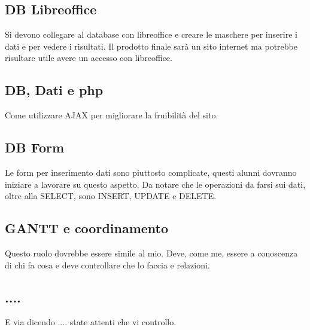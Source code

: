 \subsection*{DB Libreoffice}

Si devono collegare al database con libreoffice e creare le maschere per inserire i dati e per vedere i risultati. Il prodotto finale sarà un sito internet ma potrebbe risultare utile avere un accesso con libreoffice.

\subsection*{DB, Dati e php}

Come utilizzare A\+J\+AX per migliorare la fruibilità del sito.

\subsection*{DB Form}

Le form per inserimento dati sono piuttosto complicate, questi alunni dovranno iniziare a lavorare su questo aspetto. Da notare che le operazioni da farsi sui dati, oltre alla S\+E\+L\+E\+CT, sono I\+N\+S\+E\+RT, U\+P\+D\+A\+TE e D\+E\+L\+E\+TE.

\subsection*{G\+A\+N\+TT e coordinamento}

Questo ruolo dovrebbe essere simile al mio. Deve, come me, essere a conoscenza di chi fa cosa e deve controllare che lo faccia e relazioni.

\subsection*{....}

E via dicendo .... state attenti che vi controllo. 